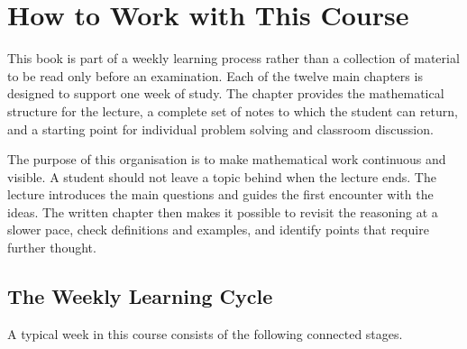 \section{How to Work with This Course}

This book is part of a weekly learning process rather than a collection of
material to be read only before an examination. Each of the twelve main
chapters is designed to support one week of study. The chapter provides the
mathematical structure for the lecture, a complete set of notes to which the
student can return, and a starting point for individual problem solving and
classroom discussion.

The purpose of this organisation is to make mathematical work continuous and
visible. A student should not leave a topic behind when the lecture ends. The
lecture introduces the main questions and guides the first encounter with the
ideas. The written chapter then makes it possible to revisit the reasoning at a
slower pace, check definitions and examples, and identify points that require
further thought.

\subsection{The Weekly Learning Cycle}

A typical week in this course consists of the following connected stages.

